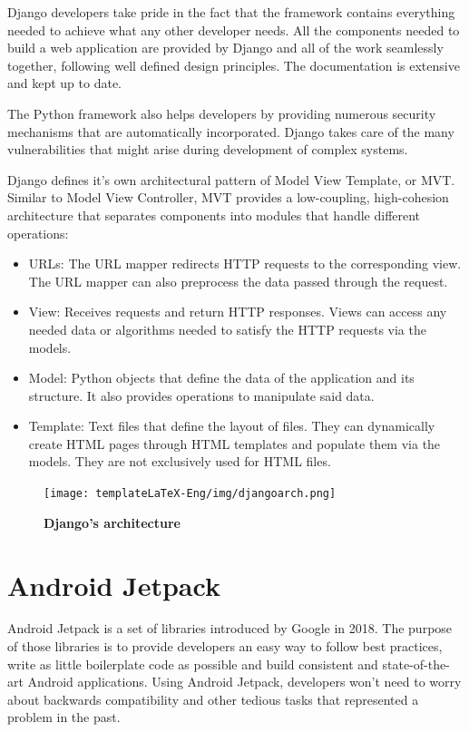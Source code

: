 \documentclass[12pt,a4paper,twoside]{report}
\begin{document}
 Django developers take pride in the fact that the framework contains everything needed to achieve what any other developer needs. All the components needed to build a web application are provided by Django and all of the work seamlessly together, following well defined design principles. The documentation is extensive and kept up to date.
 
 The Python framework also helps developers by providing numerous security mechanisms that are automatically incorporated. Django takes care of the many vulnerabilities that might arise during development of complex systems. 
 
 Django defines it's own architectural pattern of Model View Template, or MVT. Similar to Model View Controller, MVT provides a low-coupling, high-cohesion architecture that separates components into modules that handle different operations:
 \begin{itemize}
     \item URLs: The URL mapper redirects HTTP requests to the corresponding view. The URL mapper can also preprocess the data passed through the request.
     \item View: Receives requests and return HTTP responses. Views can access any needed data or algorithms needed to satisfy the HTTP requests via the models.
     \item Model: Python objects that define the data of the application and its structure. It also provides operations to manipulate said data.
     \item Template: Text files that define the layout of files. They can dynamically create HTML pages through HTML templates and populate them via the models. They are not exclusively used for HTML files.
 \end{itemize}
 
 \begin{figure}[H]
    \begin{center}
        \texttt{[image: templateLaTeX-Eng/img/djangoarch.png]}
        \caption{\bf Django's architecture\footnotemark}
    \end{center}
\end{figure}

\section{Android Jetpack}
Android Jetpack is a set of libraries introduced by Google in 2018. The purpose of those libraries is to provide developers an easy way to follow best practices, write as little boilerplate code as possible and build consistent and state-of-the-art Android applications. Using Android Jetpack, developers won't need to worry about backwards compatibility and other tedious tasks that represented a problem in the past.
\end{document}
